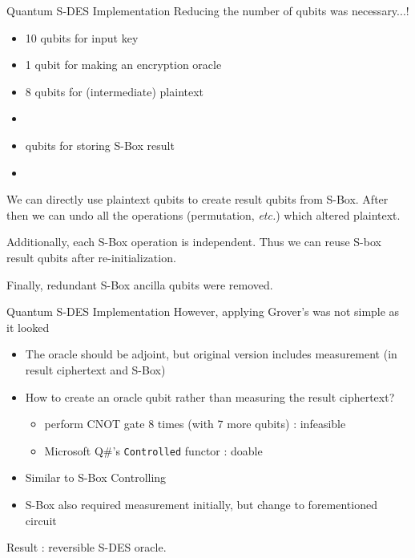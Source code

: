 \documentclass{beamer}
\begin{document}
    \begin{frame}{Quantum S-DES Implementation}
        Reducing the number of qubits was necessary...!
        \begin{itemize}
            \item 10 qubits for input key
            \item 1 qubit for making an encryption oracle
            \item 8 qubits for (intermediate) plaintext
            \item {} 
            \item {} qubits for storing S-Box result
            \item {} 
        \end{itemize}
         We can directly use plaintext qubits to create result qubits from S-Box. After then we can undo all the operations (permutation, \textit{etc.}) which altered plaintext.

        Additionally, each S-Box operation is independent. Thus we can reuse S-box result qubits after re-initialization.

        Finally, redundant S-Box ancilla qubits were removed.
    \end{frame}


    \begin{frame}{Quantum S-DES Implementation}
        However, applying Grover's was not simple as it looked
        \begin{itemize}
            \item The oracle should be adjoint, but original version includes measurement (in result ciphertext and S-Box)
            \item How to create an oracle qubit rather than measuring the result ciphertext?
            \begin{itemize}
                \item perform CNOT gate 8 times (with 7 more qubits) : infeasible
                \item Microsoft Q\#'s \texttt{Controlled} functor : doable
            \end{itemize}
            \item Similar to S-Box Controlling
            \item S-Box also required measurement initially, but change to forementioned circuit
        \end{itemize}
        Result : reversible S-DES oracle.

    \end{frame}
\end{document}
